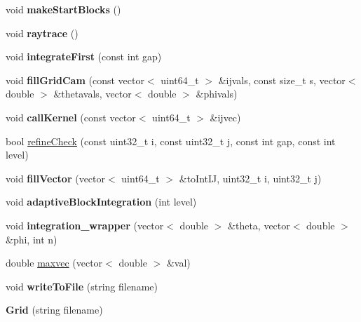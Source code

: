 \begin{DoxyCompactItemize}
void {\bfseries make\+Start\+Blocks} ()
\item 
\mbox{\label{class_grid_ab9d5411f5ca025fd13188bac6e4c4b74}} 
void {\bfseries raytrace} ()
\item 
\mbox{\label{class_grid_abdbfb61981cf0e5de52e387ba9e4cd86}} 
void {\bfseries integrate\+First} (const int gap)
\item 
\mbox{\label{class_grid_a671d787c6f65be6419e5f61e510c9379}} 
void {\bfseries fill\+Grid\+Cam} (const vector$<$ uint64\+\_\+t $>$ \&ijvals, const size\+\_\+t s, vector$<$ double $>$ \&thetavals, vector$<$ double $>$ \&phivals)
\item 
\mbox{\label{class_grid_a29671a33e4afd9d1724420f81ee92841}} 
void {\bfseries call\+Kernel} (const vector$<$ uint64\+\_\+t $>$ \&ijvec)
\item 
bool \mbox{\hyperlink{class_grid_ad5f7823505cc5ee751cdcd6b7dc1e2f4}{refine\+Check}} (const uint32\+\_\+t i, const uint32\+\_\+t j, const int gap, const int level)
\item 
\mbox{\label{class_grid_a82c78b3c4af04b4564e14b0ecf1b91b3}} 
void {\bfseries fill\+Vector} (vector$<$ uint64\+\_\+t $>$ \&to\+Int\+IJ, uint32\+\_\+t i, uint32\+\_\+t j)
\item 
\mbox{\label{class_grid_aea46b7e3cab746ec5c3bb838e3520494}} 
void {\bfseries adaptive\+Block\+Integration} (int level)
\item 
\mbox{\label{class_grid_a8484aef4c3f3dc87b22a0fef99fbb3d7}} 
void {\bfseries integration\+\_\+wrapper} (vector$<$ double $>$ \&theta, vector$<$ double $>$ \&phi, int n)
\item 
double \mbox{\hyperlink{class_grid_a272276e3a52a84dea9c72c106f0577e0}{maxvec}} (vector$<$ double $>$ \&val)
\item 
\mbox{\label{class_grid_aa3becd121073555e9304add94d65ce2d}} 
void {\bfseries write\+To\+File} (string filename)
\item 
\mbox{\label{class_grid_acc7d97429741345c97b7245f7dcb0f30}} 
{\bfseries Grid} (string filename)
\end{DoxyCompactItemize}
